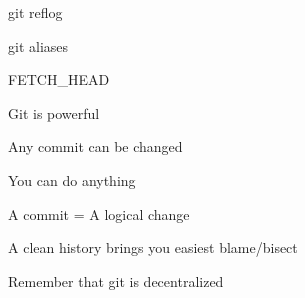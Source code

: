 \begin{iframe}[Homework]
    \item git reflog
    \item git aliases
    \item FETCH\_HEAD
\end{iframe}

\begin{iframe}[conclusion]
\item Git is powerful
\item Any commit can be changed
\item You can do anything
\item A commit = A logical change
\item A clean history brings you easiest blame/bisect
\item Remember that git is decentralized
\end{iframe}
\renewcommand{\insertLogo}{}
\contactSlide
